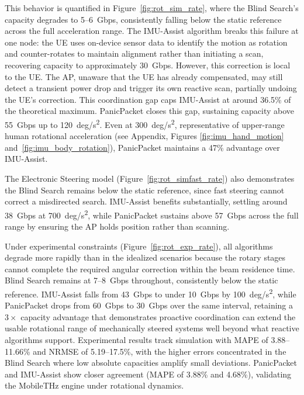 \documentclass[fleqn,10pt]{wlscirep}
\begin{document}
This behavior is quantified in Figure~\ref{fig:rot_sim_rate}, where the Blind Search's capacity degrades to \SI{5}{}--\SI{6}{Gbps}, consistently falling below the static reference across the full acceleration range. The IMU-Assist algorithm breaks this failure at one node: the UE uses on-device sensor data to identify the motion as rotation and counter-rotates to maintain alignment rather than initiating a scan, recovering capacity to approximately \SI{30}{Gbps}. However, this correction is local to the UE. The AP, unaware that the UE has already compensated, may still detect a transient power drop and trigger its own reactive scan, partially undoing the UE's correction. This coordination gap caps IMU-Assist at around 36.5\% of the theoretical maximum. PanicPacket closes this gap, sustaining capacity above \SI{55}{Gbps} up to \SI{120}{deg/s^2}. Even at \SI{300}{deg/s^2}, representative of upper-range human rotational acceleration (see Appendix, Figures \ref{fig:imu_hand_motion} and~\ref{fig:imu_body_rotation}), PanicPacket maintains a 47\% advantage over IMU-Assist.

The Electronic Steering model (Figure~\ref{fig:rot_simfast_rate}) also demonstrates the Blind Search remains below the static reference, since fast steering cannot correct a misdirected search. IMU-Assist benefits substantially, settling around \SI{38}{Gbps} at \SI{700}{deg/s^2}, while PanicPacket sustains above \SI{57}{Gbps} across the full range by ensuring the AP holds position rather than scanning.

Under experimental constraints (Figure~\ref{fig:rot_exp_rate}), all algorithms degrade more rapidly than in the idealized scenarios because the rotary stages cannot complete the required angular correction within the beam residence time. Blind Search remains at \SI{7}{}--\SI{8}{Gbps} throughout, consistently below the static reference. IMU-Assist falls from \SI{43}{Gbps} to under \SI{10}{Gbps} by \SI{100}{deg/s^2}, while PanicPacket drops from \SI{60}{Gbps} to \SI{30}{Gbps} over the same interval, retaining a $3\times$ capacity advantage that demonstrates proactive coordination can extend the usable rotational range of mechanically steered systems well beyond what reactive algorithms support. Experimental results track simulation with MAPE of 3.88--11.66\% and NRMSE of 5.19--17.5\%, with the higher errors concentrated in the Blind Search where low absolute capacities amplify small deviations. PanicPacket and IMU-Assist show closer agreement (MAPE of 3.88\% and 4.68\%), validating the MobileTHz engine under rotational dynamics.
\end{document}
